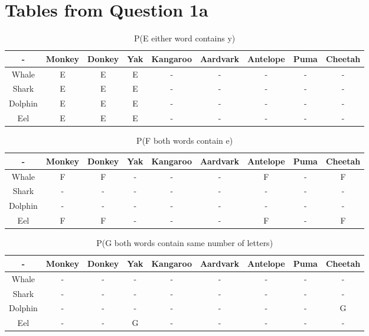 \documentclass[11pt]{article}
\begin{document}
\section*{Tables from Question 1a}
\begin{table}[b]
\caption{P(E either word contains y)}
  \begin{tabular}{|c|cccccccc|}
  	\hline
    - & Monkey & Donkey & Yak & Kangaroo & Aardvark & Antelope & Puma & Cheetah\\
    \hline
    Whale & E & E & E & - & - & - & - & -\\
    Shark & E & E & E & - & - & - & - & -\\
    Dolphin & E & E & E & - & - & - & - & -\\
    Eel & E & E & E & - & - & - & - & -\\
    \hline
  \end{tabular}
\end{table}
\begin{table}
\caption{P(F both words contain e)}
  \begin{tabular}{|c|cccccccc|}
  	\hline
    - & Monkey & Donkey & Yak & Kangaroo & Aardvark & Antelope & Puma & Cheetah\\
    \hline
    Whale & F & F & - & - & - & F & - & F\\
    Shark & - & - & - & - & - & - & - & -\\
    Dolphin & - & - & - & - & - & - & - & -\\
    Eel & F & F & - & - & - & F & - & F\\
    \hline
  \end{tabular}
\end{table}
\begin{table}
\caption{P(G both words contain same number of letters)}
  \begin{tabular}{|c|cccccccc|}
  	\hline
    - & Monkey & Donkey & Yak & Kangaroo & Aardvark & Antelope & Puma & Cheetah\\
    \hline
    Whale & - & - & - & - & - & - & - & -\\
    Shark & - & - & - & - & - & - & - & -\\
    Dolphin & - & - & - & - & - & - & - & G\\
    Eel & - & - & G & - & - & - & - & -\\
    \hline
  \end{tabular}
\end{table}
\end{document}
